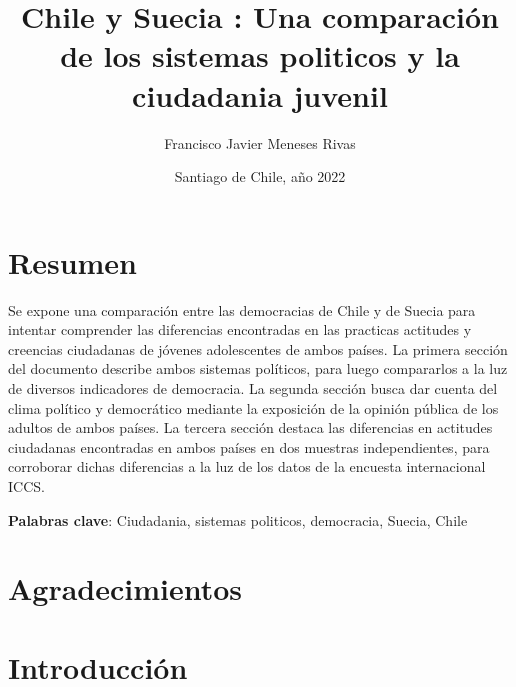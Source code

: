 \documentclass[12pt,twoside]{templates/facsothesis}
\title{{ Chile y Suecia }: Una comparación de los sistemas politicos y la ciudadania juvenil}
\author{Francisco Javier Meneses Rivas}
\date{Santiago de Chile, año 2022}
\begin{document}

  \maketitle

\frontmatter %
\pagestyle{empty} %



  \setcounter{tocdepth}{1}
  \setlength{\parskip}{0pt}
  \tableofcontents

\setlength\parskip{1em plus 0.1em minus 0.2em}

  \listoftables

  \listoffigures



\mainmatter %
\pagestyle{fancyplain} %

\hypertarget{resumen}{%
\chapter*{Resumen}\label{resumen}}

Se expone una comparación entre las democracias de Chile y de Suecia para intentar comprender las diferencias encontradas en las practicas actitudes y creencias ciudadanas de jóvenes adolescentes de ambos países. La primera sección del documento describe ambos sistemas políticos, para luego compararlos a la luz de diversos indicadores de democracia. La segunda sección busca dar cuenta del clima político y democrático mediante la exposición de la opinión pública de los adultos de ambos países. La tercera sección destaca las diferencias en actitudes ciudadanas encontradas en ambos países en dos muestras independientes, para corroborar dichas diferencias a la luz de los datos de la encuesta internacional ICCS.

\textbf{Palabras clave}: Ciudadania, sistemas politicos, democracia, Suecia, Chile

\hypertarget{agradecimientos}{%
\chapter*{Agradecimientos}\label{agradecimientos}}

\hypertarget{introducciuxf3n}{%
\chapter{Introducción}\label{introducciuxf3n}}
\end{document}
